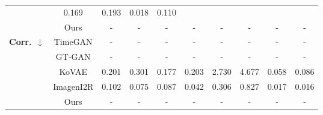 \documentclass{article}
\theoremstyle{plain}
\theoremstyle{definition}
\theoremstyle{remark}
\begin{document}
\begin{table}[!t]
{\begin{tabular}{cc|cccccccc}
               & 0.169
               & 0.193
               & 0.018
               & 0.110 \\
    & Ours
       & - & - & - & - & - & - & - & - \\
    \midrule
    \multirow{5}{*}{\textbf{Corr.}~$\downarrow$}     
      & TimeGAN & - & - & - & - & - & - & - & - \\
      & GT-GAN  & - & - & - & - & - & - & - & - \\
      & KoVAE  & 0.201 & 0.301 & 0.177 & 0.203 & 2.730 & 4.677 & 0.058 & 0.086 \\
      & ImagenI2R   & 0.102
               & 0.075
               & 0.087
               & 0.042
               & 0.306
               & 0.827
               & 0.017
               & 0.016 \\
    & Ours
       & - & - & - & - & - & - & - & - \\
    \midrule


\end{tabular}}
\end{table}
\end{document}
